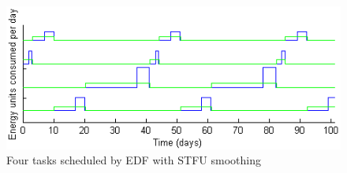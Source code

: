 \begin{figure}[htb]
\includegraphics[scale=0.72]{stfutasks.png}
\caption{Four tasks scheduled by EDF with \textsc{STFU} smoothing}
\label{fig:stfutaskplot}
\end{figure}




































